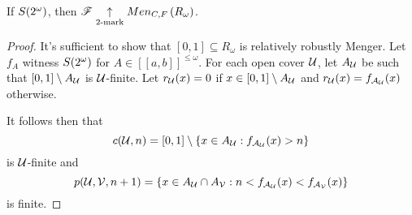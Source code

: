 \begin{thm}
  If $S(2^\omega)$, then $\mathscr{F}\underset{2\text{-mark}}{\uparrow}Men_{C,F}\left({R_\omega}\right)$.
\end{thm}

\begin{proof}
  It's sufficient to show that $[0,1]\subseteq R_\omega$ is relatively
  robustly Menger. Let $f_A$ witness $S(2^\omega)$
  for $A\in[[a,b]]^{\leq\omega}$.
  For each open cover $\mathcal{U}$, let $A_{\mathcal{U}}$ be
  such that $[0,1]\setminus A_{\mathcal{U}}$ is $\mathcal{U}$-finite.
  Let $r_{\mathcal{U}}(x)=0$ if $x\in[0,1]\setminus A_{\mathcal{U}}$ and
  $r_{\mathcal{U}}(x)=f_{\mathcal{A}_{\mathcal{U}}}(x)$ otherwise.

  It follows then that
    \[
      c(\mathcal{U},n) = [0,1]\setminus\{x\in A_{\mathcal{U}}:f_{\mathcal{A}_{\mathcal{U}}}(x)>n\}
    \]
  is $\mathcal{U}$-finite and
    \[
      p(\mathcal{U},\mathcal{V},n+1)
        =
      \{x\in A_{\mathcal{U}}\cap A_{\mathcal{V}}
        :
      n<f_{\mathcal{A}_{\mathcal{U}}}(x)<f_{\mathcal{A}_{\mathcal{V}}}(x)\}
    \]
  is finite.
\end{proof}








